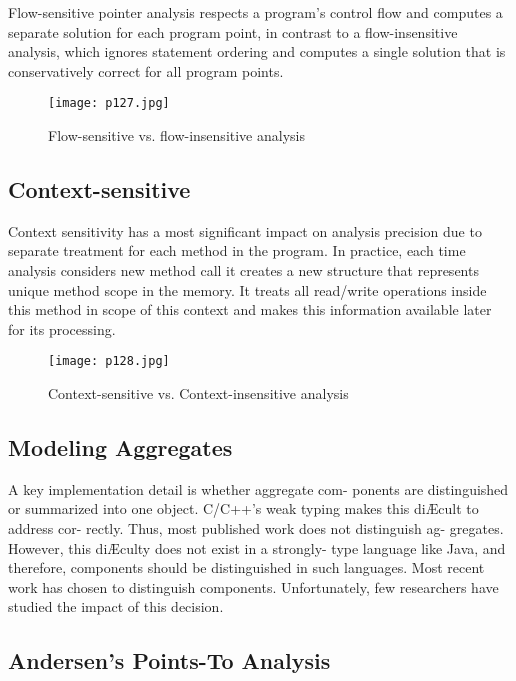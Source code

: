 Flow-sensitive pointer analysis respects a program’s control flow
and computes a separate solution for each program point, in contrast to a flow-insensitive analysis,
which ignores statement ordering and computes a single solution that is conservatively correct for
all program points.


\begin{figure}[H]
	\centering
	\texttt{[image: p127.jpg]}
	\caption{Flow-sensitive vs. flow-insensitive analysis}
	\label{fig:p127}
\end{figure}


\subsection{Context-sensitive }


Context sensitivity has a most significant impact on analysis precision due to separate
treatment for each method in the program. In practice, each time analysis considers new
method call it creates a new structure that represents unique method scope in the memory.
It treats all read/write operations inside this method in scope of this context and makes this
information available later for its processing.


\begin{figure}[H]
	\centering
	\texttt{[image: p128.jpg]}
	\caption{Context-sensitive vs. Context-insensitive analysis}
	\label{fig:p128}
\end{figure}



\subsection{Modeling Aggregates}
A key implementation detail is whether aggregate com-
ponents are distinguished or summarized into one object.
C/C++'s weak typing makes this diÆcult to address cor-
rectly. Thus, most published work does not distinguish ag-
gregates. However, this diÆculty does not exist in a strongly-
type language like Java, and therefore, components should
be distinguished in such languages. Most recent work
has chosen to distinguish components. Unfortunately, few researchers have studied the impact of this decision.



\subsection{Andersen’s Points-To Analysis}

